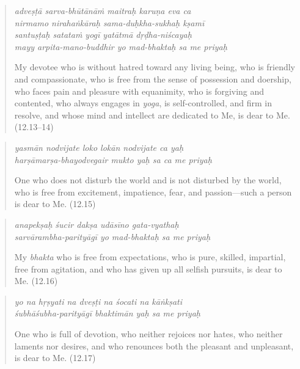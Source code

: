 \documentclass[12pt, twoside, openright]{memoir}
\begin{document}
\par
\begin{verse}
\textit{adveṣṭā sarva-bhūtānāṁ maitraḥ karuṇa eva ca} \\
\textit{nirmamo nirahaṅkāraḥ sama-duḥkha-sukhaḥ kṣamī} \\
\textit{santuṣṭaḥ satataṁ yogī yatātmā dṛḍha-niścayaḥ} \\
\textit{mayy arpita-mano-buddhir yo mad-bhaktaḥ sa me priyaḥ}

\noindent My devotee who is without hatred toward any living being, who is friendly and compassionate, who is free from the sense of possession and doership, who faces pain and pleasure with equanimity, who is forgiving and contented, who always engages in \textit{yoga}, is self-controlled, and firm in resolve, and whose mind and intellect are dedicated to Me, is dear to Me. (12.13–14)
\end{verse}
\par



\par
\begin{verse}
\textit{yasmān nodvijate loko lokān nodvijate ca yaḥ} \\
\textit{harṣāmarṣa-bhayodvegair mukto yaḥ sa ca me priyaḥ}

\noindent One who does not disturb the world and is not disturbed by the world, who is free from excitement, impatience, fear, and passion---such a person is dear to Me. (12.15)
\end{verse}
\par



\par
\begin{verse}
\textit{anapekṣaḥ śucir dakṣa udāsīno gata-vyathaḥ} \\
\textit{sarvārambha-parityāgī yo mad-bhaktaḥ sa me priyaḥ}

\noindent My \textit{bhakta} who is free from expectations, who is pure, skilled, impartial, free from agitation, and who has given up all selfish pursuits, is dear to Me. (12.16)
\end{verse}
\par



\par
\begin{verse}
\textit{yo na hṛṣyati na dveṣṭi na śocati na kāṅkṣati} \\
\textit{śubhāśubha-parityāgī bhaktimān yaḥ sa me priyaḥ}

\noindent One who is full of devotion, who neither rejoices nor hates, who neither laments nor desires, and who renounces both the pleasant and unpleasant, is dear to Me. (12.17)
\end{verse}
\par
\end{document}

